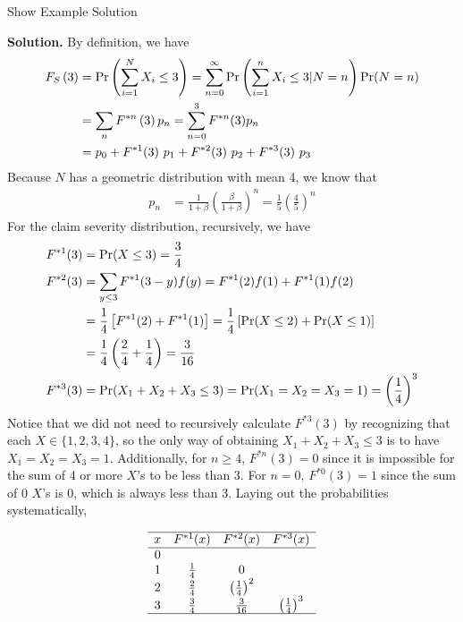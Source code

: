 \documentclass[]{book}
\theoremstyle{definition}
\theoremstyle{definition}
\theoremstyle{definition}
\theoremstyle{remark}
\begin{document}
Show Example Solution

\hypertarget{toggleExampleAggLoss.3.3}{}
\textbf{Solution.} By definition, we have \[\begin{aligned}
F_{S}\left(3 \right) &= {\rm Pr}\left(\sum_{i=1}^N X_i \leq 3\right) = \sum_{n=0}^\infty {\rm Pr}\left(\sum_{i=1}^n X_i\leq 3|N=n\right){\rm Pr}(N=n) \\
&= \sum_n F^{\ast n} \left(3 \right) p_n = \sum_{n=0}^3 F^{\ast n}(3) p_n \\
&= p_0 + F^{\ast 1}(3) \ p_1 + F^{\ast 2}(3) \ p_2 + F^{\ast 3}(3) \ p_3
\end{aligned}\] Because \(N\) has a geometric distribution with mean 4,
we know that \[\begin{aligned}
p_n &= \frac{1}{1+\beta}
\left(\frac{\beta}{1+ \beta} \right)^n = \frac{1}{5} \left(\frac{4}{5} \right)^n
\end{aligned}\] For the claim severity distribution, recursively, we
have \[\begin{aligned}
F^{\ast 1}(3) &= \Pr(X \le 3) = \frac{3}{4} \\
F^{\ast 2}(3) &= \sum_{y \le 3} F^{\ast 1} (3-y) f(y) = F^{\ast 1}(2)f(1) + F^{\ast 1}(1)f(2) \\
&= \frac{1}{4}\left[F^{\ast 1} (2) + F^{\ast 1}(1)\right] = \frac{1}{4}\left[{\rm Pr}(X\leq 2) + {\rm Pr}(X \leq 1) \right] \\
&= \frac{1}{4} \left(\frac{2}{4} + \frac{1}{4} \right) = \frac{3}{16}\\
F^{\ast 3}(3) &= \Pr(X_1+X_2 + X_3 \le 3) = \Pr(X_1=X_2=X_3=1) = \left(\frac{1}{4} \right)^3
\end{aligned}\] Notice that we did not need to recursively calculate
\(F^{\ast 3}(3)\) by recognizing that each \(X \in \{1,2,3,4\}\), so the
only way of obtaining \(X_1+X_2+X_3 \leq 3\) is to have
\(X_1=X_2=X_3=1\). Additionally, for \(n \geq 4\), \(F^{\ast n} (3)=0\)
since it is impossible for the sum of 4 or more \(X\)'s to be less than
3. For \(n=0\), \(F^{\ast 0}(3) = 1\) since the sum of 0 \(X\)'s is 0,
which is always less than 3. Laying out the probabilities
systematically,

\[\begin {matrix}
\begin{array}{c c c c}\hline
    x & F^{\ast 1}(x) & F^{\ast 2}(x) & F^{\ast 3}(x)\\ \hline
    0 & & & \\
    1 & \frac{1}{4} & 0 & \\
    2 & \frac{2}{4} & \left( \frac{1}{4} \right)^2 & \\
    3 & \frac{3}{4} & \frac{3}{16} & \left( \frac{1}{4} \right)^3 \\ \hline
\end{array}
\end{matrix}\]
\end{document}
